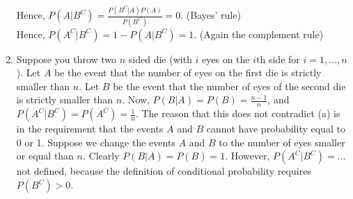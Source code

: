 \begin{exercise}[BH.2.17]
\begin{solution}
\begin{enumerate}
		Hence, $P(A|B^C) = \frac{P(B^{C}|A)P(A)}{P(B^{C})} = 0$. (Bayes' rule)\\
		Hence, $P(A^{C}|B^{C}) = 1-P(A|B^{C}) = 1$. (Again the complement rule)
		\item  Suppose you throw two $n$ sided die (with $i$ eyes on the $i$th side for $i=1,\ldots,n$). Let $A$ be the event that the number of eyes on the first die is strictly smaller than $n$. Let $B$ be the event that the number of eyes of the second die is strictly smaller than $n$. Now, $P(B|A)=P(B) = \frac{n-1}{n}$, and $P(A^{C}|B^{C})=P(A^{C})=\frac{1}{n}$. The reason that this does not contradict (a) is in the requirement that the events $A$ and $B$ cannot have probability equal to 0 or 1. Suppose we change the events $A$ and $B$ to the number of eyes smaller or equal than $n$. Clearly $P(B|A)=P(B)=1$. However, $P(A^{C}|B^{C})=...$ not defined, because the definition of conditional probability requires $P(B^C)>0$. 
	\end{enumerate}
\end{solution}
\end{exercise}

